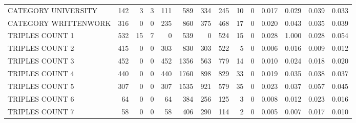 \begin{tabular}{lrrrrrrrrrllll}
 CATEGORY UNIVERSITY      &             142 &             3 &               3 &             111 &             589 &  334 &  245 &   10 &    0 & 0.017 & 0.029 & 0.039 & 0.033 \\
 CATEGORY WRITTENWORK     &             316 &             0 &               0 &             235 &             860 &  375 &  468 &   17 &    0 & 0.020 & 0.043 & 0.035 & 0.039 \\
 TRIPLES COUNT 1          &             532 &            15 &               7 &               0 &             539 &    0 &  524 &   15 &    0 & 0.028 & 1.000 & 0.028 & 0.054 \\
 TRIPLES COUNT 2          &             415 &             0 &               0 &             303 &             830 &  303 &  522 &    5 &    0 & 0.006 & 0.016 & 0.009 & 0.012 \\
 TRIPLES COUNT 3          &             452 &             0 &               0 &             452 &            1356 &  563 &  779 &   14 &    0 & 0.010 & 0.024 & 0.018 & 0.020 \\
 TRIPLES COUNT 4          &             440 &             0 &               0 &             440 &            1760 &  898 &  829 &   33 &    0 & 0.019 & 0.035 & 0.038 & 0.037 \\
 TRIPLES COUNT 5          &             307 &             0 &               0 &             307 &            1535 &  921 &  579 &   35 &    0 & 0.023 & 0.037 & 0.057 & 0.045 \\
 TRIPLES COUNT 6          &              64 &             0 &               0 &              64 &             384 &  256 &  125 &    3 &    0 & 0.008 & 0.012 & 0.023 & 0.016 \\
 TRIPLES COUNT 7          &              58 &             0 &               0 &              58 &             406 &  290 &  114 &    2 &    0 & 0.005 & 0.007 & 0.017 & 0.010 \\
\hline
\end{tabular}